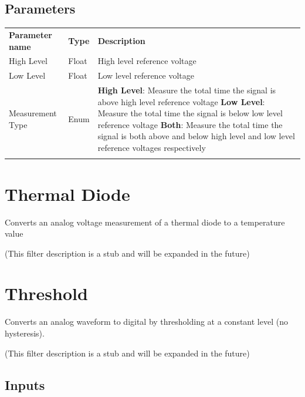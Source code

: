 \subsection{Parameters}

\begin{tabularx}{16cm}{llX}
\thickhline
\textbf{Parameter name} & \textbf{Type} & \textbf{Description} \\
\thickhline
High Level & Float & High level reference voltage\\
\thinhline
Low Level & Float & Low level reference voltage\\
\thinhline
Measurement Type & Enum &
	\textbf{High Level}: Measure the total time the signal is above high level reference voltage \newline
	\textbf{Low Level}: Measure the total time the signal is below low level reference voltage \newline
	\textbf{Both}: Measure the total time the signal is both above and below high level and low level reference voltages respectively\\
\thickhline
\end{tabularx}

\pagebreak
\section{Thermal Diode}

Converts an analog voltage measurement of a thermal diode to a temperature value

(This filter description is a stub and will be expanded in the future)

\pagebreak
\section{Threshold}
\label{filter:threshold}

Converts an analog waveform to digital by thresholding at a constant level (no hysteresis).

(This filter description is a stub and will be expanded in the future)

\subsection{Inputs}


